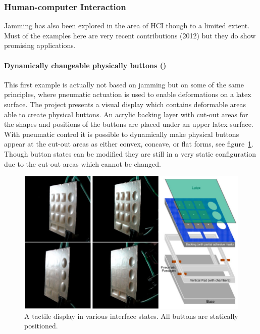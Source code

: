 \subsubsection{Human-computer Interaction}
\label{ch:jamming:related-work:hci}
Jamming has also been explored in the area of HCI though to a limited extent.
Must of the examples here are very recent contributions (2012) but they do show promising applications.

\paragraph{Dynamically changeable physically buttons (\citeyear{harrison2009providing})} 
\label{ch:jamming:related-work:hci:dynbuttons}
This first example is actually not based on jamming but on some of the same principles, where pneumatic actuation is used to enable deformations on a latex surface.
The project presents a visual display which contains deformable areas able to create physical buttons.
An acrylic backing layer with cut-out areas for the shapes and positions of the buttons are placed under an upper latex surface.
With pneumatic control it is possible to dynamically make physical buttons appear at the cut-out areas as either convex, concave, or flat forms, see figure~\ref{fig:ch:jamming:concepts:harrisonhudson}.
Though button states can be modified they are still in a very static configuration due to the cut-out areas which cannot be changed.

\begin{figure}[h]
  \centering
      \includegraphics[width=.9\textwidth]{figures/jamming/concepts/harrisonhudson}
  \caption[A tactile display in various interfaces states. All buttons are statically positioned.]
  {A tactile display in various interface states. All buttons are statically positioned.}
  \label{fig:ch:jamming:concepts:harrisonhudson}
\end{figure}

